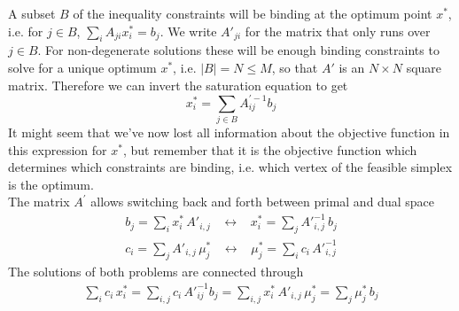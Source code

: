 \documentclass[a4paper,10pt]{article}
\begin{document}
A subset $B$ of the inequality constraints will be binding at the
optimum point $x^*$, i.e. for $j\in B$, $\sum_i A_{ji} x^*_i = b_j$. We
write $A'_{ji}$ for the matrix that only runs over $j\in B$. For
non-degenerate solutions these will be enough binding constraints to
solve for a unique optimum $x^*$, i.e. $|B| = N \leq M$, so that $A'$ is an $N\times N$
square matrix.  Therefore we can invert the saturation equation to get
\begin{equation}
  x^*_i = \sum_{j\in B} A^{\prime -1}_{ij} b_j
\end{equation}
It might seem that we've now lost all information about the objective function in this expression for $x^*$, but remember that it is the objective function which determines which constraints are binding, i.e. which vertex of the feasible simplex is the optimum.\\
% 
The matrix $A^{\prime}$ allows switching back and forth between primal and dual space
\begin{align}
b_j = \sum_i x^*_i \, A'_{i,j} \hspace{10pt} \leftrightarrow \hspace{10pt} x^*_i = \sum_j {A'}_{i,j}^{-1} \, b_j \\
c_i = \sum_j A'_{i,j} \, \mu^*_j  \hspace{10pt} \leftrightarrow \hspace{10pt} \mu^*_j = \sum_i c_i \, {A'}_{i,j}^{-1}
\end{align}
The solutions of both problems are connected through
\begin{align}
\sum_i c_i \, x^*_i = \sum_{i,j}  c_i \, {A'}^{-1}_{ij} b_j = \sum_{i,j} x^*_i \, A'_{i,j} \, \mu^*_j = \sum_j \mu^*_j \, b_j 
\end{align}
\end{document}
